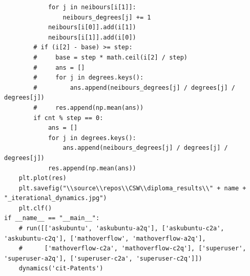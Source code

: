 \documentclass[bachelor, och, diploma]{SCWorks}
\begin{document}
\begin{verbatim}
            for j in neibours[i[1]]:
                neibours_degrees[j] += 1
            neibours[i[0]].add(i[1])
            neibours[i[1]].add(i[0])
        # if (i[2] - base) >= step:
        #     base = step * math.ceil(i[2] / step)
        #     ans = []
        #     for j in degrees.keys():
        #         ans.append(neibours_degrees[j] / degrees[j] / degrees[j])
        #     res.append(np.mean(ans))
        if cnt % step == 0:
            ans = []
            for j in degrees.keys():
                ans.append(neibours_degrees[j] / degrees[j] / degrees[j])
            res.append(np.mean(ans))
    plt.plot(res)
    plt.savefig("\\source\\repos\\CSW\\diploma_results\\" + name + "_iterational_dynamics.jpg")
    plt.clf()
if __name__ == "__main__":
    # run([['askubuntu', 'askubuntu-a2q'], ['askubuntu-c2a', 'askubuntu-c2q'], ['mathoverflow', 'mathoverflow-a2q'], 
    #      ['mathoverflow-c2a', 'mathoverflow-c2q'], ['superuser', 'superuser-a2q'], ['superuser-c2a', 'superuser-c2q']])
    dynamics('cit-Patents')
\end{verbatim}
\end{document}
